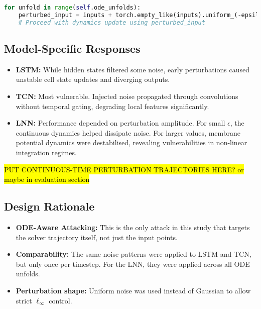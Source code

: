\begin{lstlisting}[language=Python, caption={Continuous-Time Perturbation Injection}]
for unfold in range(self.ode_unfolds):
    perturbed_input = inputs + torch.empty_like(inputs).uniform_(-epsilon, epsilon)
    # Proceed with dynamics update using perturbed_input
\end{lstlisting}

\subsection{Model-Specific Responses}
\begin{itemize}
    \item \textbf{LSTM:} While hidden states filtered some noise, early perturbations caused unstable cell state updates and diverging outputs.
    \item \textbf{TCN:} Most vulnerable. Injected noise propagated through convolutions without temporal gating, degrading local features significantly.
    \item \textbf{LNN:} Performance depended on perturbation amplitude. For small $\epsilon$, the continuous dynamics helped dissipate noise. For larger values, membrane potential dynamics were destabilised, revealing vulnerabilities in non-linear integration regimes.
\end{itemize}

\hl{PUT CONTINUOUS-TIME PERTURBATION TRAJECTORIES HERE? or maybe in evaluation section}


\subsection{Design Rationale}
\begin{itemize}
    \item \textbf{ODE-Aware Attacking:} This is the only attack in this study that targets the solver trajectory itself, not just the input points.
    \item \textbf{Comparability:} The same noise patterns were applied to LSTM and TCN, but only once per timestep. For the LNN, they were applied across all ODE unfolds.
    \item \textbf{Perturbation shape:} Uniform noise was used instead of Gaussian to allow strict $\ell_\infty$ control.
\end{itemize}


